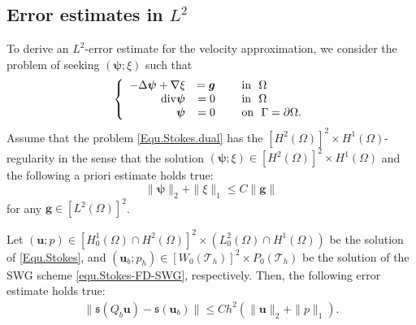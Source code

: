 \documentclass[final,leqno]{siamltex704}
\def\S{{\mathfrak s}}
\def\T{{\mathcal T}}
\begin{document}
\subsection{Error estimates in $L^2$}
To derive an $L^2$-error estimate for the velocity approximation, we consider the problem of seeking $(\bm{\psi};\xi)$ such that
\begin{equation}\label{Equ.Stokes.dual}
\left\{
\begin{array}{rrl}
-\Delta \bm{\psi}+ \nabla \xi &=\bm{g}  &\quad \text{ in }\ \Omega\\
{\rm div} \bm{\psi}&=0                  &\quad \text{ in }\ \Omega\\
 \bm{\psi}&=0                           &\quad \text{ on }\ \Gamma=\partial \Omega.
\end{array}
\right.
\end{equation}
Assume that the problem \eqref{Equ.Stokes.dual} has the $[H^2(\Omega)]^2\times H^1(\Omega)$-regularity in the sense that the solution
$(\bm{\psi};\xi) \in [H^2(\Omega)]^2\times H^1(\Omega)$ and the following a priori estimate holds true:
\begin{equation}\label{equ.regularity}
\|\bm{\psi}\|_2+\|\xi\|_1\leq C\|\bm{g}\|
\end{equation}
for any $\bm{g}\in [L^2(\Omega)]^2$.

\begin{theorem}\label{thm.error.3}
Let $(\bm{u};p) \in [H_0^1(\Omega)\cap H^{2}(\Omega)]^2\times (L_0^2(\Omega)\cap H^{1}(\Omega))$ be the solution of \eqref{Equ.Stokes}, and $(\bm{u}_b;p_h) \in [W_0(\T_h)]^2 \times P_0(\T_h)$ be the solution of the SWG scheme \eqref{equ.Stokes-FD-SWG}, respectively.
Then, the following error estimate holds true:
\begin{eqnarray} \label{equ.thm.error.3}
\|\S(Q_b \bm{u}) - \S(\bm{u}_b)\| \leq Ch^2 (\|\bm{u}\|_2+\|p\|_1).
\end{eqnarray}
\end{theorem}
\end{document}
